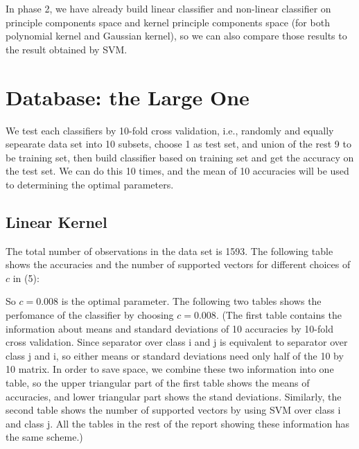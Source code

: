\documentclass{article}
\begin{document}
In phase 2, we have already build linear classifier and non-linear classifier on principle components space and kernel principle components space (for both polynomial kernel and Gaussian kernel), so we can also compare those results to the result obtained by SVM.

\goodbreak

\section{Database: the Large One}

We test each classifiers by 10-fold cross validation, i.e., randomly and equally sepearate data set into 10 subsets, choose 1 as test set, and union of the rest 9 to be training set, then build classifier based on training set and get the accuracy on the test set. We can do this 10 times, and the mean of 10 accuracies will be used to determining the optimal parameters.

\subsection{Linear Kernel}

The total number of observations in the data set is 1593. The following table shows the accuracies and the number of supported vectors for different choices of $c$ in (5):  

  
So $c=0.008$ is the optimal parameter. The following two tables shows the perfomance of the classifier by choosing $c=0.008$. (The first table contains the information about means and standard deviations of 10 accuracies by 10-fold cross validation. Since separator over class i and j is equivalent to separator over class j and i, so either means or standard deviations need only half of the 10 by 10 matrix. In order to save space, we combine these two information into one table, so the upper triangular part of the first table shows the means of accuracies, and lower triangular part shows the stand deviations. Similarly, the second table shows the number of supported vectors by using SVM over class i and class j. All the tables in the rest of the report showing these information has the same scheme.)
\end{document}
